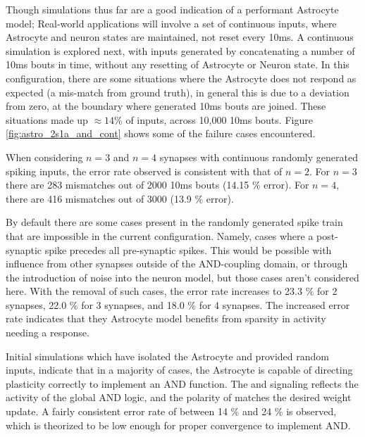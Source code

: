Though simulations thus far are a good indication of a performant Astrocyte
model; Real-world applications will involve a set of continuous inputs, where
Astrocyte and neuron states are maintained, not reset every 10ms. A continuous
simulation is explored next, with inputs generated by concatenating a number of
10ms bouts in time, without any resetting of Astrocyte or Neuron state. In this
configuration, there are some situations where the Astrocyte does not respond as
expected (a mis-match from ground truth), in general this is due to a \ca
deviation from zero, at the boundary where generated 10ms bouts are
joined. These situations made up $\approx 14\%$ of inputs, across 10,000 10ms
bouts. Figure \ref{fig:astro_2s1a_and_cont} shows some of the failure cases
encountered.


When considering $n=3$ and $n=4$ synapses with continuous randomly generated
spiking inputs, the error rate observed is consistent with that of $n=2$. For
$n=3$ there are 283 mismatches out of 2000 10ms bouts (14.15 \% error). For
$n=4$, there are 416 mismatches out of 3000 (13.9 \% error).

By default there are some cases present in the randomly generated spike train
that are impossible in the current configuration. Namely, cases where a
post-synaptic spike precedes all pre-synaptic spikes. This would be possible
with influence from other synapses outside of the AND-coupling domain, or
through the introduction of noise into the neuron model, but those cases aren't
considered here. With the removal of such cases, the error rate increases to
23.3 \% for 2 synapses, 22.0 \% for 3 synapses, and 18.0 \% for 4 synapses. The
increased error rate indicates that they Astrocyte model benefits from sparsity
in activity needing a response.

Initial simulations which have isolated the Astrocyte and provided random
inputs, indicate that in a majority of cases, the Astrocyte is capable of
directing plasticity correctly to implement an AND function. The
\dser and \serca signaling reflects the activity of the global AND logic, and
the polarity of \dser matches the desired weight update. A fairly consistent
error rate of between 14 \% and 24 \% is observed, which is theorized to be low
enough for proper convergence to implement AND.

